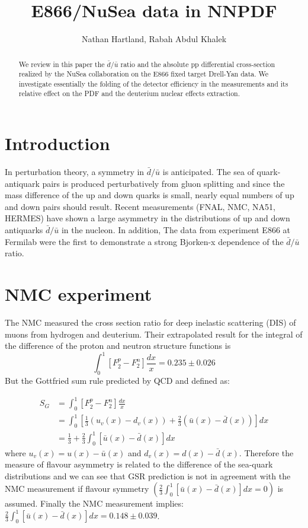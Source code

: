 \documentclass[11pt]{article}
\title{E866/NuSea data in NNPDF}
\author{Nathan Hartland, Rabah Abdul Khalek}
\begin{document}
\maketitle

\begin{abstract}
We review in this paper the $\bar{d}/\bar{u}$ ratio and the absolute pp differential cross-section realized by the NuSea collaboration on the E866 fixed target Drell-Yan data. We investigate essentially the folding of the detector efficiency in the measurements and its relative effect on the PDF and the deuterium nuclear effects extraction.
\end{abstract}

\section{Introduction}
In perturbation theory, a symmetry in $\bar{d}/\bar{u}$ is anticipated. The sea of quark-antiquark pairs is produced perturbatively from gluon splitting and since the mass difference of the up and down quarks is small, nearly equal numbers of up and down pairs should result.
Recent measurements (FNAL, NMC, NA51, HERMES) have shown a large asymmetry in the distributions of up and down antiquarks $\bar{d}/\bar{u}$ in the nucleon. 
In addition, The data from experiment E866 at Fermilab were the first to demonstrate a strong Bjorken-x dependence of the $\bar{d}/\bar{u}$ ratio.

\section{NMC experiment}
The NMC measured the cross section ratio for deep inelastic scattering (DIS) of muons from hydrogen and deuterium.
Their extrapolated result for the integral of the difference of the proton and neutron structure functions is 
\begin{equation}
\int_0^1[F_2^p - F_2^n]\frac{dx}{x} = 0.235 \pm 0.026
\end{equation}
But the Gottfried sum rule predicted by QCD and defined as:

\begin{equation}
\begin{split}
S_G & = \int_0^1[F_2^p - F_2^n]\frac{dx}{x} \\
& =\int_0^1 [\frac{1}{3}(u_v(x)-d_v(x))+\frac{2}{3}(\bar{u}(x)-\bar{d}(x))]dx \\
& = \frac{1}{3} + \frac{2}{3}\int_0^1[\bar{u}(x) - \bar{d}(x)]dx
\end{split}
\end{equation}
where $u_v(x) = u(x) - \bar{u}(x)$ and $d_v(x) = d(x) - \bar{d}(x)$.
Therefore the measure of flavour asymmetry is related to the difference of the sea-quark distributions and we can see that GSR prediction is not in agreement with the NMC measurement if flavour symmetry $(\frac{2}{3}\int_0^1[\bar{u}(x) - \bar{d}(x)]dx = 0)$ is assumed.
Finally the NMC measurement implies: $\frac{2}{3}\int_0^1[\bar{u}(x) - \bar{d}(x)]dx = 0.148 \pm 0.039$.
\end{document}
